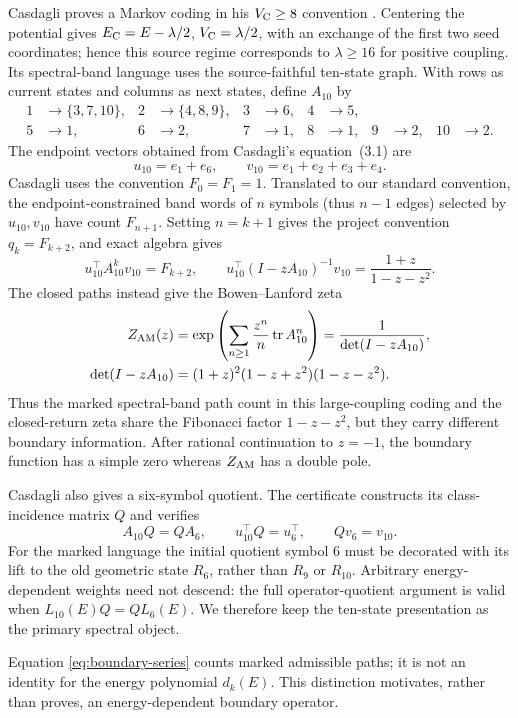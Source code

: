 Casdagli proves a Markov coding in his \(V_{\rm C}\ge8\) convention
\citep[Secs.~2--3]{casdagli1986}.  Centering the potential gives
\(E_{\rm C}=E-\lambda/2\), \(V_{\rm C}=\lambda/2\), with an exchange of the
first two seed coordinates; hence this source regime corresponds to
\(\lambda\ge16\) for positive coupling.  Its spectral-band language uses the
source-faithful ten-state graph.  With rows as current states and columns as
next states, define \(A_{10}\) by
\begin{align}
1&\to\{3,7,10\},&2&\to\{4,8,9\},&
3&\to6,&4&\to5,\nonumber\\
5&\to1,&6&\to2,&7&\to1,&8&\to1,&
9&\to2,&10&\to2.
\label{eq:casdagli-data}
\end{align}
The endpoint vectors obtained from Casdagli's equation~(3.1) are
\[
u_{10}=e_1+e_6,\qquad v_{10}=e_1+e_2+e_3+e_4.
\]
Casdagli uses the convention \(F_0=F_1=1\).  Translated to our standard
convention, the endpoint-constrained band words of \(n\) symbols (thus
\(n-1\) edges) selected by \(u_{10},v_{10}\) have count \(F_{n+1}\).
Setting \(n=k+1\) gives the project convention
\(q_k=F_{k+2}\), and exact algebra gives
\begin{equation}
u_{10}^\top A_{10}^kv_{10}=F_{k+2},\qquad
u_{10}^\top(I-zA_{10})^{-1}v_{10}=\frac{1+z}{1-z-z^2}.
\label{eq:boundary-series}
\end{equation}
The closed paths instead give the Bowen--Lanford zeta
\begin{align}
Z_{\mathrm{AM}}(z)
&=\exp\left(\sum_{n\ge1}\frac{z^n}{n}\operatorname{tr} A_{10}^n\right)
=\frac1{\det(I-zA_{10})},\\
\det(I-zA_{10})
&=(1+z)^2(1-z+z^2)(1-z-z^2).
\label{eq:closed-zeta}
\end{align}
Thus the marked spectral-band path count in this large-coupling coding and
the closed-return zeta share the Fibonacci
factor \(1-z-z^2\), but they carry different boundary information.  After
rational continuation to \(z=-1\), the boundary function has a simple zero
whereas \(Z_{\mathrm{AM}}\) has a double pole.

Casdagli also gives a six-symbol quotient.  The certificate constructs its
class-incidence matrix \(Q\) and verifies
\[
A_{10}Q=QA_6,\qquad u_{10}^\top Q=u_6^\top,\qquad Qv_6=v_{10}.
\]
For the marked language the initial quotient symbol \(6\) must be decorated
with its lift to the old geometric state \(R_6\), rather than \(R_9\) or
\(R_{10}\).  Arbitrary energy-dependent weights need not descend: the full
operator-quotient argument is valid when
\(L_{10}(E)Q=QL_6(E)\).  We therefore keep the ten-state presentation as the
primary spectral object.

Equation \eqref{eq:boundary-series} counts marked admissible paths; it is not
an identity for the energy polynomial \(d_k(E)\).  This distinction motivates,
rather than proves, an energy-dependent boundary operator.
